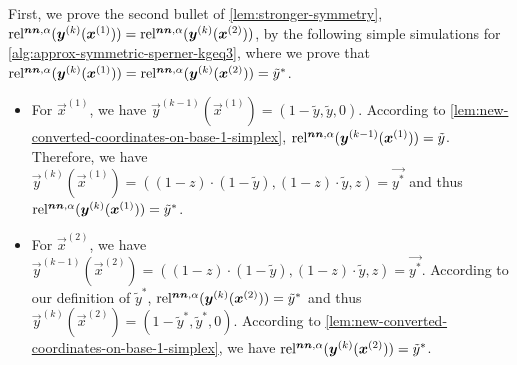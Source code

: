 First, we prove the second bullet of \cref{lem:stronger-symmetry}, $\operatorname*{rel^{\boldsymbol{nn},\alpha}}(\boldsymbol{y}^{(k)}(\boldsymbol{x}^{(1)})) = \operatorname*{rel^{\boldsymbol{nn},\alpha}}(\boldsymbol{y}^{(k)}(\boldsymbol{x}^{(2)}))$, by the following simple simulations for \cref{alg:approx-symmetric-sperner-kgeq3}, where
we prove that $\operatorname*{rel^{\boldsymbol{nn},\alpha}}(\boldsymbol{y}^{(k)}(\boldsymbol{x}^{(1)})) = \operatorname*{rel^{\boldsymbol{nn},\alpha}}(\boldsymbol{y}^{(k)}(\boldsymbol{x}^{(2)}))=\tilde{y}^*$.
\begin{itemize}[itemsep=0.2em, topsep=0.5em]
    \item For $\vec{x}^{(1)}$, we have $\vec{y}^{(k-1)}(\vec{x}^{(1)})=(1-\tilde{y}, \tilde{y}, 0)$. According to \cref{lem:new-converted-coordinates-on-base-1-simplex}, $\operatorname*{rel^{\boldsymbol{nn},\alpha}}(\boldsymbol{y}^{(k-1)}(\boldsymbol{x}^{(1)})) = \tilde{y}$. 
    Therefore, we have $\vec{y}^{(k)}(\vec{x}^{(1)}) = ((1-z)\cdot (1-\tilde{y}), (1-z)\cdot \tilde{y}, z)=\vec{y^*}$ and thus $\operatorname*{rel^{\boldsymbol{nn},\alpha}}(\boldsymbol{y}^{(k)}(\boldsymbol{x}^{(1)}))=\tilde{y}^*$. 
    \item For $\vec{x}^{(2)}$, we have $\vec{y}^{(k-1)}(\vec{x}^{(2)})=((1-z)\cdot (1-\tilde{y}), (1-z) \cdot \tilde{y}, z)=\vec{y^*}$.
    According to our definition of $\tilde{y}^*$, $\operatorname*{rel^{\boldsymbol{nn},\alpha}}(\boldsymbol{y}^{(k)}(\boldsymbol{x}^{(2)}))=\tilde{y}^*$ and thus $\vec{y}^{(k)}(\vec{x}^{(2)})=(1-\tilde{y}^*,\tilde{y}^*,0)$.
    According to \cref{lem:new-converted-coordinates-on-base-1-simplex}, we have $\operatorname*{rel^{\boldsymbol{nn},\alpha}}(\boldsymbol{y}^{(k)}(\boldsymbol{x}^{(2)}))=\tilde{y}^*$.
\end{itemize}

